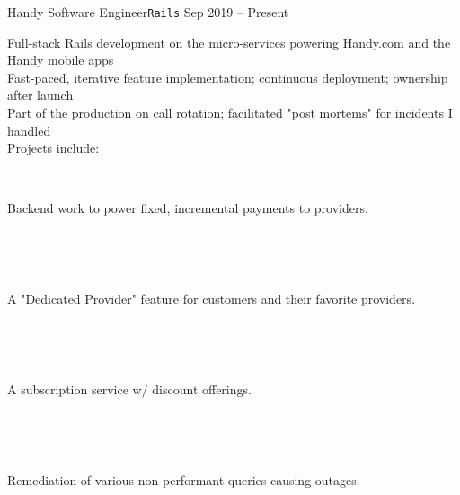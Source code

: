 \documentclass[9pt]{developercv} %
\begin{document}



\begin{entrylist}
     \entry
        {Handy}
        {Software Engineer\hspace{1mm}\texttt{Rails}}
        {Sep 2019 -- Present}
        {
            Full-stack Rails development on the micro-services powering Handy.com and the Handy mobile apps\\
            Fast-paced, iterative feature implementation; continuous deployment; ownership after launch\\
            Part of the production on call rotation; facilitated "post mortems" for incidents I handled\\
            Projects include:\\
            \begin{minipage}[t]{0.05\textwidth}\,\end{minipage}
            \begin{minipage}[t]{0.8\textwidth}Backend work to power fixed, incremental payments to providers.\end{minipage}\\
            \begin{minipage}[t]{0.05\textwidth}\,\end{minipage}
            \begin{minipage}[t]{0.8\textwidth}A "Dedicated Provider" feature for customers and their favorite providers.\end{minipage}\\
            \begin{minipage}[t]{0.05\textwidth}\,\end{minipage}
            \begin{minipage}[t]{0.8\textwidth}A subscription service w/ discount offerings.\end{minipage}\\
            \begin{minipage}[t]{0.05\textwidth}\,\end{minipage}
            \begin{minipage}[t]{0.8\textwidth}Remediation of various non-performant queries causing outages.\end{minipage}
}
\end{entrylist}
\end{document}
